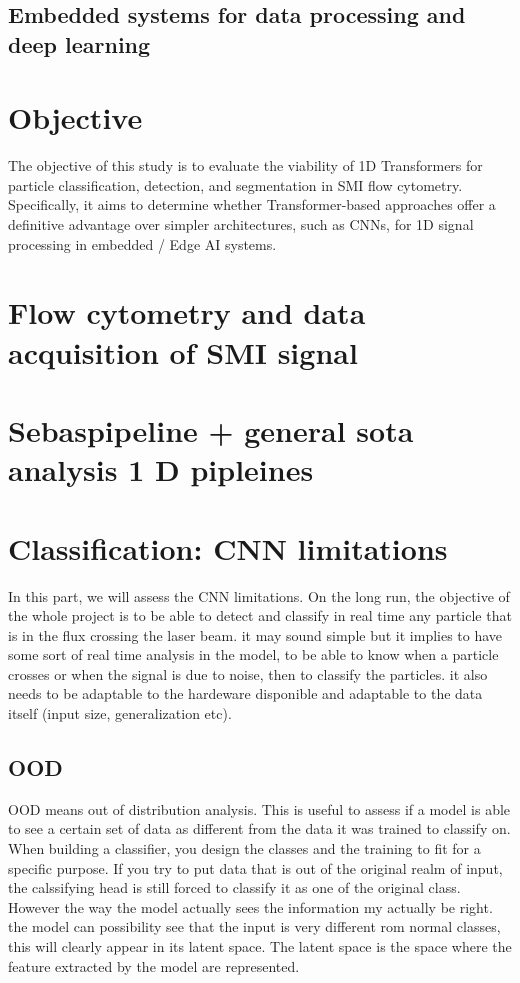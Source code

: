 \documentclass{article}
\begin{document}
\subsection{Embedded systems for data processing and deep learning}



\section{Objective}
The objective of this study is to evaluate the viability of 1D Transformers for particle classification, detection, and segmentation in SMI flow cytometry. Specifically, it aims to determine whether Transformer-based approaches offer a definitive advantage over simpler architectures, such as CNNs, for 1D signal processing in embedded / Edge AI systems.

\section{Flow cytometry and data acquisition of SMI signal}

\section{Sebaspipeline + general sota analysis 1 D pipleines}

\section{Classification: CNN limitations}

In this part, we will assess the CNN limitations. On the long run, the objective of the whole project is to be able to detect and classify in real time any particle that is in the flux crossing the laser beam. it may sound simple but it implies to have some sort of real time analysis in the model, to be able to know when a particle crosses or when the signal is due to noise, then to classify the particles. it also needs to be adaptable to the hardeware disponible and adaptable to the data itself (input size, generalization etc).

\subsection{OOD}
OOD means out of distribution analysis. This is useful to assess if a model is able to see a certain set of data as different from the data it was trained to classify on. When building a classifier, you design the classes and the training to fit for a specific purpose. If you try to put data that is out of the original realm of input, the calssifying head is still forced to classify it as one of the original class. However the way the model actually sees the information my actually be right. the model can possibility see that the input is very different rom normal classes, this will clearly appear in its latent space. The latent space is the space where the feature extracted by the model are represented.
\end{document}
